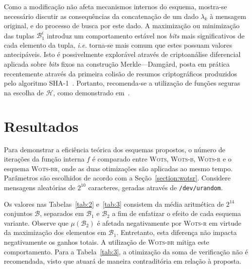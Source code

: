 \documentclass{ufsctex/ufsctex}
\newcommand{\hh}{\mathcal{H}}
\newcommand{\wots}{\textsc{Wots}}
\newcommand{\wotsb}{\textsc{Wots-b}}
\newcommand{\wotsr}{\textsc{Wots-r}}
\newcommand{\wotsbr}{\textsc{Wots-br}}
\begin{document}
Como a modificação não afeta mecanismos internos do esquema, mostra-se
necessário discutir as consequências da concatenação de um dado $\lambda_k$ à
mensagem original, e do processo de busca por este dado. A maximização ou
minimização das tuplas $\mathcal{B}_{1}^{i}$ introduz um comportamento estável
nos \emph{bits} mais significativos de cada elemento da tupla, \emph{i.e.}
torna-se mais comum que estes possuam valores antecipáveis. Isto é
possivelmente explorável através de criptoanálise diferencial aplicada sobre
\emph{bits} fixos na construção Merkle---Damgård, posta em prática recentemente
através da primeira colisão de resumos criptográficos produzidos pelo algoritmo
SHA-1~\cite{Stevens2017}. Portanto, recomenda-se a utilização de funções
seguras na escolha de $\hh{}$, como demonstrado em~\cite{Hlsing2013}.

\section{Resultados}\label{section:results}

Para demonstrar a eficiência teórica dos esquemas propostos, o número de
iterações da função interna $f$ é comparado entre \wots{}, \wotsb{}, \wotsr{} e
o esquema \wotsbr{}, onde as duas otimizações são aplicadas ao mesmo tempo.
Parâmetros são escolhidos de acordo com a Seção~\ref{section:wotsr}. Considere
mensagens aleatórias de $2^{10}$ caracteres, geradas através de
\texttt{/dev/urandom}.

Os valores nas Tabelas~\ref{tab:2} e~\ref{tab:3} consistem da média aritmética
de $2^{14}$ conjuntos $\mathcal{B}$, separados em $\mathcal{B}_1$ e
$\mathcal{B}_2$ a fim de enfatizar o efeito de cada esquema variante. Observe
que $\mu(\mathcal{B}_2)$ é afetada negativamente por \wotsr{} em virtude da
maximização dos elementos em $\mathcal{B}_1$. Entretanto, esta diferença não
impacta negativamente os ganhos totais. A utilização de \wotsbr{} mitiga este
comportamento. Para a Tabela~\ref{tab:3}, a otimização da soma de verificação
não é recomendada, visto que atuará de maneira contraditória em relação à
proposta.
\end{document}
